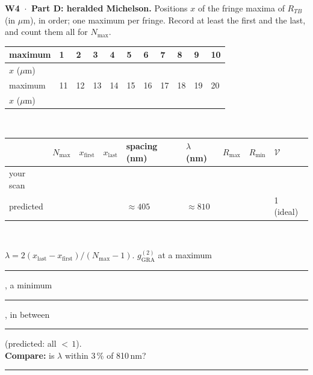 \documentclass[a4paper,11pt]{article}
\newcommand{\gtwo}[1]{g^{(2)}_{\mathrm{#1}}}
\newcommand{\blank}[1]{\rule{#1}{0.4pt}}
\begin{document}
\newpage
\textbf{W4 \,$\cdot$\, Part D: heralded Michelson.}
{\small Positions $x$ of the fringe maxima of $R_{TB}$ (in $\mu$m), in order; one maximum per fringe.
Record at least the first and the last, and count them all for $N_{\max}$.}\\[2pt]
\begin{tabular}{|Y{1.55cm}|*{10}{Y{1.25cm}|}}\hline
maximum & 1 & 2 & 3 & 4 & 5 & 6 & 7 & 8 & 9 & 10 \\ \hline
$x$ ($\mu$m) & & & & & & & & & & \\ \hline
maximum & 11 & 12 & 13 & 14 & 15 & 16 & 17 & 18 & 19 & 20 \\ \hline
$x$ ($\mu$m) & & & & & & & & & & \\ \hline
\end{tabular}\\[3pt]
\begin{tabular}{|Y{2.4cm}|Y{1.3cm}|Y{1.6cm}|Y{1.6cm}|Y{2.2cm}|Y{1.5cm}|Y{1.4cm}|Y{1.4cm}|Y{1.2cm}|}\hline
 & $N_{\max}$ & $x_{\mathrm{first}}$ & $x_{\mathrm{last}}$ & spacing (nm) & $\lambda$ (nm) & $R_{\max}$ & $R_{\min}$ & $\mathcal{V}$ \\ \hline
your scan & & & & & & & & \\ \hline
predicted & & & & $\approx 405$ & $\approx 810$ & & & 1 (ideal) \\ \hline
\end{tabular}\\[3pt]
{\small $\lambda = 2(x_{\mathrm{last}} - x_{\mathrm{first}})/(N_{\max} - 1)$.\quad
$\gtwo{GRA}$ at a maximum \blank{1.3cm}, a minimum \blank{1.3cm}, in between \blank{1.3cm}
(predicted: all ${<}\,1$).\\
\textbf{Compare:} is $\lambda$ within 3\,\% of 810\,nm? \blank{8.5cm}}
\end{document}
